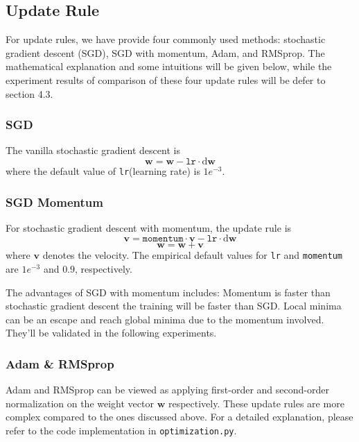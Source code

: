 \documentclass[10pt,a4paper,twoside]{tau}
\renewcommand{\vec}[1]{\mathbf{#1}}
\renewcommand{\d}{\text{d}}
\begin{document}
\subsection{Update Rule}

For update rules, we have provide four commonly used methods: stochastic gradient descent (SGD), SGD with momentum, Adam, and RMSprop. The mathematical explanation and some intuitions will be given below, while the experiment results of comparison of these four update rules will be defer to section 4.3.

\subsubsection{SGD}

The vanilla stochastic gradient descent is
\begin{equation}
    \vec{w} = \vec{w} - \texttt{lr} \cdot\d \vec{w} \tag{4.1.1}
\end{equation}
where the default value of \texttt{lr}(learning rate) is $1e^{-3}$.

\subsubsection{SGD Momentum}

For stochastic gradient descent with momentum, the update rule is 
\begin{equation}
    \vec{v} = \texttt{momentum} \cdot\vec{v} - \texttt{lr} \cdot\d\vec{w} \tag{4.1.2}
\end{equation}
\begin{equation}
    \vec{w} = \vec{w} + \vec{v} \tag{4.1.3}
\end{equation}
where $\vec{v}$ denotes the velocity. The empirical default values for \texttt{lr} and \texttt{momentum} are $1e^{-3}$ and $0.9$, respectively.

The advantages of SGD with momentum includes:
Momentum is faster than stochastic gradient descent the training will be faster than SGD. Local minima can be an escape and reach global minima due to the momentum involved. They'll be validated in the following experiments.

\subsubsection{Adam \& RMSprop}
Adam and RMSprop can be viewed as applying first-order and second-order normalization on the weight vector $\vec{w}$ respectively. These update rules are more complex compared to the ones discussed above. For a detailed explanation, please refer to the code implementation in \texttt{optimization.py}.
\end{document}
